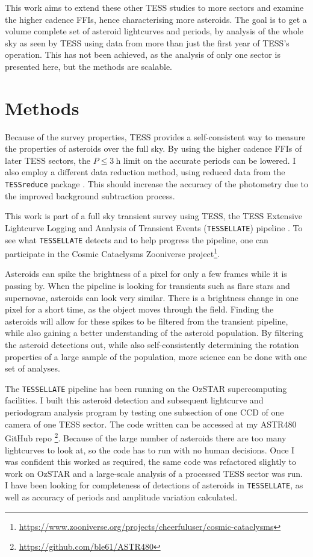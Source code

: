 \documentclass{UCreport}
\begin{document}
This work aims to extend these other TESS studies to more sectors and examine the higher cadence FFIs, hence characterising more asteroids.
The goal is to get a volume complete set of asteroid lightcurves and periods, by analysis of the whole sky as seen by TESS using data from more than just the first year of TESS's operation.
This has not been achieved, as the analysis of only one sector is presented here, but the methods are scalable.

\section{Methods}\label{Sec:Meth}

Because of the survey properties, TESS provides a self-consistent way to measure the properties of asteroids over the full sky.
By using the higher cadence FFIs of later TESS sectors, the $P\leq\qty{3}{\hour}$ limit on the accurate periods \citep[as found by ][]{McNeill2023} can be lowered.
I also employ a different data reduction method, using reduced data from the \texttt{TESSreduce} package \citep{Ridden-Harper2021}.
This should increase the accuracy of the photometry due to the improved background subtraction process.

This work is part of a full sky transient survey using TESS, the TESS Extensive Lightcurve Logging and Analysis of Transient Events (\texttt{TESSELLATE}) pipeline \citep{TESSELLATE}.
To see what \texttt{TESSELLATE} detects and to help progress the pipeline, one can participate in the Cosmic Cataclysms Zooniverse project\footnote{\href{https://www.zooniverse.org/projects/cheerfuluser/cosmic-cataclysms}{https://www.zooniverse.org/projects/cheerfuluser/cosmic-cataclysms}}.

Asteroids can spike the brightness of a pixel for only a few frames while it is passing by.
When the pipeline is looking for transients such as flare stars and supernovae, asteroids can look very similar.
There is a brightness change in one pixel for a short time, as the object moves through the field.
Finding the asteroids will allow for these spikes to be filtered from the transient pipeline, while also gaining a better understanding of the asteroid population.
By filtering the asteroid detections out, while also self-consistently determining the rotation properties of a large sample of the population, more science can be done with one set of analyses.

The \texttt{TESSELLATE} pipeline has been running on the OzSTAR supercomputing facilities.
I built this asteroid detection and subsequent lightcurve and periodogram analysis program by testing one subsection of one CCD of one camera  of one TESS sector.
The code written can be accessed at my ASTR480 GitHub repo \footnote{\href{https://github.com/ble61/ASTR480}{https://github.com/ble61/ASTR480}}.
Because of the large number of asteroids there are too many lightcurves to look at, so the code has to run with no human decisions.
Once I was confident this worked as required, the same code was refactored slightly to work on OzSTAR and a large-scale analysis of a processed TESS sector was run.
I have been looking for completeness of detections of asteroids in \texttt{TESSELLATE}, as well as accuracy of periods and amplitude variation calculated.
\end{document}
